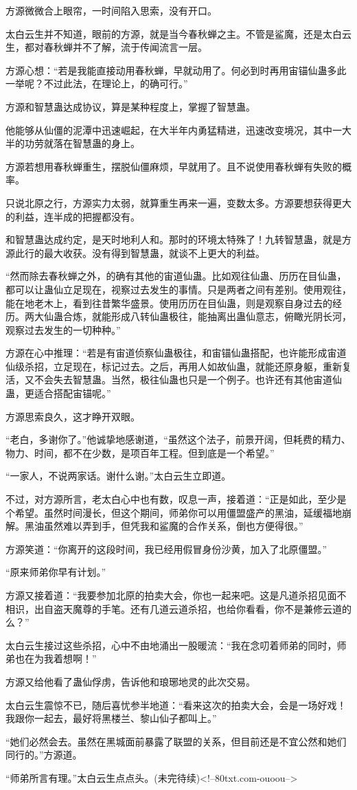 \begin{this_body}
方源微微合上眼帘，一时间陷入思索，没有开口。

太白云生并不知道，眼前的方源，就是当今春秋蝉之主。不管是鲨魔，还是太白云生，都对春秋蝉并不了解，流于传闻流言一层。

方源心想：“若是我能直接动用春秋蝉，早就动用了。何必到时再用宙锚仙蛊多此一举呢？不过此法，在理论上，的确可行。”

方源和智慧蛊达成协议，算是某种程度上，掌握了智慧蛊。

他能够从仙僵的泥潭中迅速崛起，在大半年内勇猛精进，迅速改变境况，其中一大半的功劳就落在智慧蛊的身上。

方源若想用春秋蝉重生，摆脱仙僵麻烦，早就用了。且不说使用春秋蝉有失败的概率。

只说北原之行，方源实力太弱，就算重生再来一遍，变数太多。方源要想获得更大的利益，连半成的把握都没有。

和智慧蛊达成约定，是天时地利人和。那时的环境太特殊了！九转智慧蛊，就是方源此行的最大收获。没有得到智慧蛊，就谈不上更大的利益。

“然而除去春秋蝉之外，的确有其他的宙道仙蛊。比如观往仙蛊、历历在目仙蛊，都可以让蛊仙立足现在，视察过去发生的事情。只是两者之间有差别。使用观往，能在地老木上，看到往昔繁华盛景。使用历历在目仙蛊，则是观察自身过去的经历。两大仙蛊合炼，就能形成八转仙蛊极往，能抽离出蛊仙意志，俯瞰光阴长河，观察过去发生的一切种种。”

方源在心中推理：“若是有宙道侦察仙蛊极往，和宙锚仙蛊搭配，也许能形成宙道仙级杀招，立足现在，标记过去。之后，再用人如故仙蛊，就能还原身躯，重新复活，又不会失去智慧蛊。当然，极往仙蛊也只是一个例子。也许还有其他宙道仙蛊，更适合搭配宙锚呢。”

方源思索良久，这才睁开双眼。

“老白，多谢你了。”他诚挚地感谢道，“虽然这个法子，前景开阔，但耗费的精力、物力、时间，都不在少数，是项百年工程。但到底是一个希望。”

“一家人，不说两家话。谢什么谢。”太白云生立即道。

不过，对方源所言，老太白心中也有数，叹息一声，接着道：“正是如此，至少是个希望。虽然时间漫长，但这个期间，师弟你可以用僵盟盛产的黑油，延缓福地崩解。黑油虽然难以弄到手，但凭我和鲨魔的合作关系，倒也方便得很。”

方源笑道：“你离开的这段时间，我已经用假冒身份沙黄，加入了北原僵盟。”

“原来师弟你早有计划。”

方源又接着道：“我要参加北原的拍卖大会，你也一起来吧。这是凡道杀招见面不相识，出自盗天魔尊的手笔。还有几道云道杀招，也给你看看，你不是兼修云道的么？”

太白云生接过这些杀招，心中不由地涌出一股暖流：“我在念叨着师弟的同时，师弟也在为我着想啊！”

方源又给他看了蛊仙俘虏，告诉他和琅琊地灵的此次交易。

太白云生震惊不已，随后喜忧参半地道：“看来这次的拍卖大会，会是一场好戏！我跟你一起去，最好将黑楼兰、黎山仙子都叫上。”

“她们必然会去。虽然在黑城面前暴露了联盟的关系，但目前还是不宜公然和她们同行的。”方源道。

“师弟所言有理。”太白云生点点头。(未完待续)<!--80txt.com-ouoou-->

\end{this_body}

